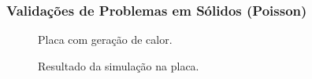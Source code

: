\documentclass{beamer}
\begin{document}
\begin{frame}
  \frametitle{Validações de Problemas em Sólidos (Poisson)}
  
  \begin{minipage}{.48\textwidth}
    \centering
    \begin{figure}
       {\raggedleft \tiny Placa com geração de calor.}
    \end{figure}
  \end{minipage}
  \hfill
  \begin{minipage}{.48\textwidth}
    \begin{figure}
       {\raggedleft \tiny Resultado da simulação na placa.}
    \end{figure}
  \end{minipage}
  

\end{frame}
\end{document}
